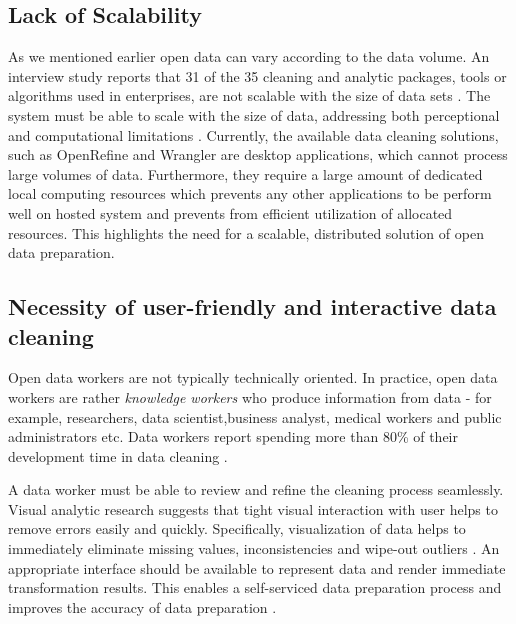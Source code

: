 \subsection{Lack of Scalability}
\noindent As we mentioned earlier open data can vary according to the data volume. An interview study reports that 31 of the 35 cleaning and analytic packages, tools or algorithms used in enterprises, are not scalable with the size of data sets \cite{2012-enterprise-analysis-interviews}. The system must be able to scale with the size of data, addressing both perceptional and computational limitations \cite{2012-enterprise-analysis-interviews}. Currently, the available data cleaning solutions, such as  OpenRefine \cite{openrefine}  and Wrangler \cite{2011-wrangler} are desktop applications, which cannot process large volumes of data. Furthermore, they require a large amount of dedicated local computing resources which prevents any other applications to be perform well on hosted system and prevents from efficient utilization of allocated resources. This highlights the need for a scalable, distributed solution of open data preparation. 
\subsection{Necessity of user-friendly and interactive data cleaning}
\noindent 
Open data workers are not typically technically oriented. In practice, open data workers are rather \textit{knowledge workers} who produce information from data - for example, researchers, data scientist,business analyst, medical workers and public administrators etc. Data workers report spending more than 80\% of their development time in data cleaning \cite{visualizationsandtransformationsinwrangling}\cite{Wisteria}\cite{journals/corr/KrishnanW0FG16}.

A data worker must be able to review and refine the cleaning process seamlessly. Visual analytic research \cite{Keim08visualanalytics:} suggests that tight visual interaction with user helps to remove errors easily and quickly. Specifically, visualization of data helps to immediately eliminate missing values, inconsistencies and wipe-out outliers \cite{visualizationsandtransformationsinwrangling}. An appropriate interface should be available to represent data and render immediate transformation results. This enables a self-serviced data preparation process and improves the accuracy of data preparation \cite{journals/corr/KrishnanW0FG16}. 

